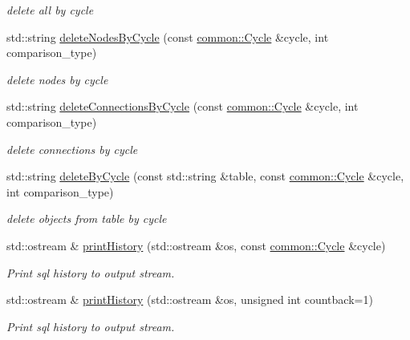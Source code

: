 \begin{DoxyCompactItemize}
\begin{DoxyCompactList}\small\item\em delete all by cycle \end{DoxyCompactList}\item 
std\-::string \hyperlink{classcryomesh_1_1manager_1_1DatabaseManager_ae7b5187077ed92ee43b408a635f0ec87}{delete\-Nodes\-By\-Cycle} (const \hyperlink{classcryomesh_1_1common_1_1Cycle}{common\-::\-Cycle} \&cycle, int comparison\-\_\-type)
\begin{DoxyCompactList}\small\item\em delete nodes by cycle \end{DoxyCompactList}\item 
std\-::string \hyperlink{classcryomesh_1_1manager_1_1DatabaseManager_a419d14216ddd047471c8c5d5124b83cf}{delete\-Connections\-By\-Cycle} (const \hyperlink{classcryomesh_1_1common_1_1Cycle}{common\-::\-Cycle} \&cycle, int comparison\-\_\-type)
\begin{DoxyCompactList}\small\item\em delete connections by cycle \end{DoxyCompactList}\item 
std\-::string \hyperlink{classcryomesh_1_1manager_1_1DatabaseManager_a8095a326205cb6bccf529291f3ecb372}{delete\-By\-Cycle} (const std\-::string \&table, const \hyperlink{classcryomesh_1_1common_1_1Cycle}{common\-::\-Cycle} \&cycle, int comparison\-\_\-type)
\begin{DoxyCompactList}\small\item\em delete objects from table by cycle \end{DoxyCompactList}\item 
std\-::ostream \& \hyperlink{classcryomesh_1_1manager_1_1DatabaseManager_a91bcff35ff6bc32dcb9eee99d416f1e2}{print\-History} (std\-::ostream \&os, const \hyperlink{classcryomesh_1_1common_1_1Cycle}{common\-::\-Cycle} \&cycle)
\begin{DoxyCompactList}\small\item\em \-Print sql history to output stream. \end{DoxyCompactList}\item 
std\-::ostream \& \hyperlink{classcryomesh_1_1manager_1_1DatabaseManager_ae949b3904e471572d7cbe389016b991e}{print\-History} (std\-::ostream \&os, unsigned int countback=1)
\begin{DoxyCompactList}\small\item\em \-Print sql history to output stream. \end{DoxyCompactList}\end{DoxyCompactItemize}
